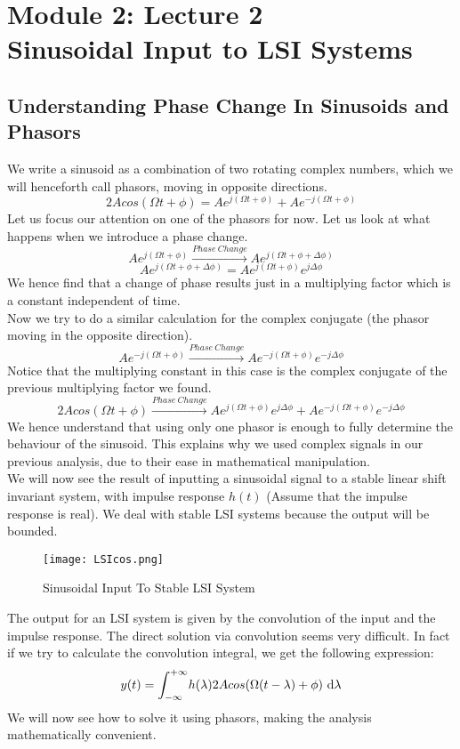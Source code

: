 \section{Module 2: Lecture 2\\Sinusoidal Input to LSI Systems}



\subsection{Understanding Phase Change In Sinusoids and Phasors}
We write a sinusoid as a combination of two rotating complex numbers, which we will henceforth call phasors, moving in opposite directions. 
\[
	2Acos(\Omega t + \phi) = Ae^{j(\Omega t + \phi)} + Ae^{-j(\Omega t + \phi)}
\]
Let us focus our attention on one of the phasors for now. Let us look at what happens when we introduce a phase change.\\
\[
Ae^{j(\Omega t + \phi)} \xrightarrow{Phase \ Change} Ae^{j(\Omega t + \phi + \Delta\phi)}
\]
\[
Ae^{j(\Omega t + \phi + \Delta\phi)} =
Ae^{j(\Omega t + \phi)}e^{j\Delta\phi}
\]
We hence find that a change of phase results just in a multiplying factor which is a constant independent of time.\\
Now we try to do a similar calculation for the complex conjugate (the phasor moving in the opposite direction).
\[
Ae^{-j(\Omega t + \phi)} \xrightarrow{Phase \ Change} Ae^{-j(\Omega t + \phi)}e^{-j\Delta\phi}
\]
Notice that the multiplying constant in this case is the complex conjugate of the previous multiplying factor we found.\\
\[
	2Acos(\Omega t + \phi) \xrightarrow{Phase \ Change} Ae^{j(\Omega t + \phi)}e^{j\Delta\phi} + Ae^{-j(\Omega t + \phi)}e^{-j\Delta\phi}
\]
We hence understand that using only one phasor is enough to fully determine the behaviour of the sinusoid. This explains why we used complex signals in our previous analysis, due to their ease in mathematical manipulation.\\
We will now see the result of inputting a sinusoidal signal to a stable linear shift invariant system, with impulse response $h(t)$ (Assume that the impulse response is real). We deal with stable LSI systems because the output will be bounded.\\
\begin{figure}[ht]
\begin{center}
\texttt{[image: LSIcos.png]}
\caption{Sinusoidal Input To Stable LSI System}
\end{center}
\end{figure}
The output for an LSI system is given by the convolution of the input and the impulse response.
The direct solution via convolution seems very difficult. In fact if we try to calculate the convolution integral, we get the following expression:
\[
y(t) = \int_{-\infty}^{+\infty} \! {h(\lambda)2Acos(\Omega(t-\lambda) + \phi) \ \dm \lambda}\]
We will now see how to solve it using phasors, making the analysis mathematically convenient.
